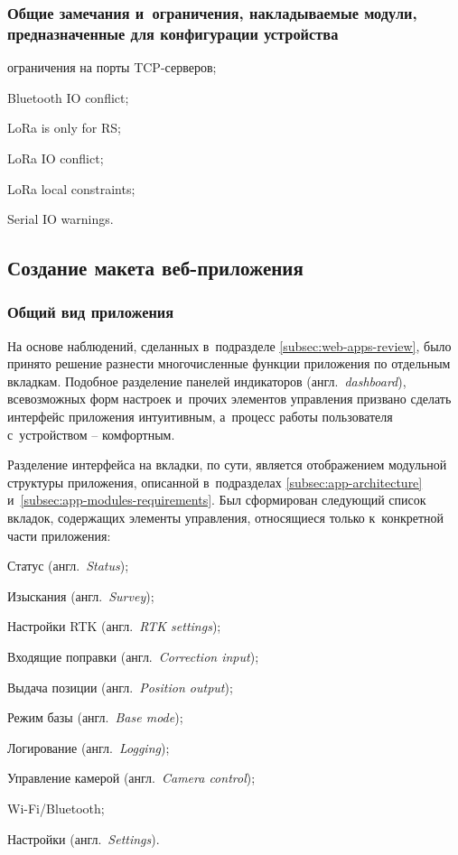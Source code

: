 \subsubsection{Общие замечания и~ограничения, накладываемые модули, предназначенные для конфигурации устройства}

\begin{dashitemize}
  \item ограничения на порты TCP-серверов;
  \item Bluetooth IO conflict;
  \item LoRa is only for RS;
  \item LoRa IO conflict;
  \item LoRa local constraints;
  \item Serial IO warnings.
\end{dashitemize}


\subsection{Создание макета веб-приложения}
\label{subsec:app-sketch}

\subsubsection{Общий вид приложения}
\label{subsec:app-sketch-general}

На основе наблюдений, сделанных в~подразделе \ref{subsec:web-apps-review}, было принято решение разнести многочисленные функции приложения по отдельным вкладкам. Подобное разделение панелей индикаторов (англ.~\emph{dashboard}), всевозможных форм настроек и~прочих элементов управления призвано сделать интерфейс приложения интуитивным, а~процесс работы пользователя с~устройством -- комфортным.

Разделение интерфейса на вкладки, по сути, является отображением модульной структуры приложения, описанной в~подразделах \ref{subsec:app-architecture} и~\ref{subsec:app-modules-requirements}. Был сформирован следующий список вкладок, содержащих элементы управления, относящиеся только к~конкретной части приложения:

\begin{dashitemize}
  \item Статус (англ.~\emph{Status});
  \item Изыскания (англ.~\emph{Survey});
  \item Настройки RTK (англ.~\emph{RTK settings});
  \item Входящие поправки (англ.~\emph{Correction input});
  \item Выдача позиции (англ.~\emph{Position output});
  \item Режим базы (англ.~\emph{Base mode});
  \item Логирование (англ.~\emph{Logging});
  \item Управление камерой (англ.~\emph{Camera control});
  \item Wi-Fi/Bluetooth;
  \item Настройки (англ.~\emph{Settings}).
\end{dashitemize}

